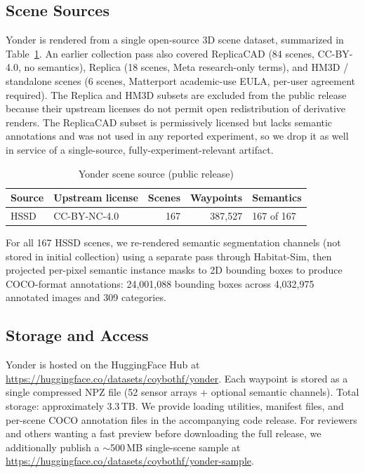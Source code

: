 \documentclass[conference]{IEEEtran}
\begin{document}
\subsection{Scene Sources}

Yonder is rendered from a single open-source 3D scene dataset, summarized in Table~\ref{tab:sources}. An earlier collection pass also covered ReplicaCAD (84 scenes, CC-BY-4.0, no semantics), Replica (18 scenes, Meta research-only terms), and HM3D / standalone scenes (6 scenes, Matterport academic-use EULA, per-user agreement required). The Replica and HM3D subsets are excluded from the public release because their upstream licenses do not permit open redistribution of derivative renders. The ReplicaCAD subset is permissively licensed but lacks semantic annotations and was not used in any reported experiment, so we drop it as well in service of a single-source, fully-experiment-relevant artifact.

\begin{table}[t]
\centering
\caption{Yonder scene source (public release)}
\label{tab:sources}
\begin{tabular}{llrrl}
\toprule
Source & Upstream license & Scenes & Waypoints & Semantics \\
\midrule
HSSD & CC-BY-NC-4.0 & 167 & 387,527 & 167 of 167 \\
\bottomrule
\end{tabular}
\end{table}

For all 167 HSSD scenes, we re-rendered semantic segmentation channels (not stored in initial collection) using a separate pass through Habitat-Sim, then projected per-pixel semantic instance masks to 2D bounding boxes to produce COCO-format annotations: 24,001,088 bounding boxes across 4,032,975 annotated images and 309 categories.

\subsection{Storage and Access}

Yonder is hosted on the HuggingFace Hub at \url{https://huggingface.co/datasets/coybothf/yonder}. Each waypoint is stored as a single compressed NPZ file (52 sensor arrays + optional semantic channels). Total storage: approximately 3.3\,TB. We provide loading utilities, manifest files, and per-scene COCO annotation files in the accompanying code release. For reviewers and others wanting a fast preview before downloading the full release, we additionally publish a $\sim$500\,MB single-scene sample at \url{https://huggingface.co/datasets/coybothf/yonder-sample}.
\end{document}
